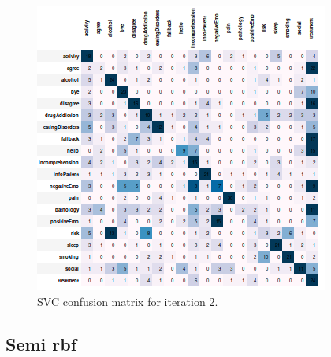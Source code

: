 \documentclass[11pt]{article}
\begin{document}
\begin{figure}[h]
	\centering
	\includegraphics[scale=0.7]{lsvc_2.png}
	\caption{SVC confusion matrix for iteration 2.}
\label{lsvc_cm_2}
\end{figure}
\FloatBarrier



\subsection{Semi rbf}
\end{document}
